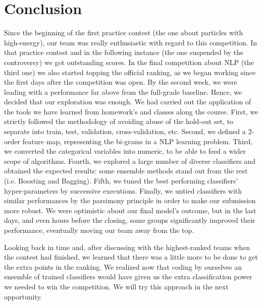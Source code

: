 \chapter{Conclusion}\label{ch:conclusion}

Since the beginning of the first practice contest (the one about particles with high-energy), our team was really enthusiastic with regard to this competition. In that practice contest and in the following instance (the one suspended by the controversy) we got outstanding scores. In the final competition about NLP (the third one) we also started topping the official ranking, as we began working since the first days after the competition was open. By the second week, we were leading with a performance far above from the full-grade baseline. Hence, we decided that our exploration was enough. We had carried out the application of the tools we have learned from homework's and classes along the course. First, we strictly followed the methodology of avoiding abuse of the hold-out set, to separate into train, test, validation, cross-validation, etc. Second, we defined a 2-order feature map, representing the bi-grams in a NLP learning problem. Third, we converted the categorical variables into numeric, to be able to feed a wider scope of algorithms. Fourth, we explored a large number of diverse classifiers and obtained the expected results: some ensemble methods stand out from the rest (i.e. Boosting and Bagging). Fifth, we tuned the best performing classifiers' hyper-parameters by successive executions. Finally, we untied classifiers with similar performances by the parsimony principle in order to make our submission more robust. We were optimistic about our final model's outcome, but in the last days, and even hours before the closing, some groups significantly improved their performance, eventually moving our team away from the top.

Looking back in time and, after discussing with the highest-ranked teams when the contest had finished, we learned that there was a little more to be done to get the extra points in the ranking. We realized now that coding by ourselves an ensemble of trained classifiers would have given us the extra classification power we needed to win the competition. We will try this approach in the next opportunity. 